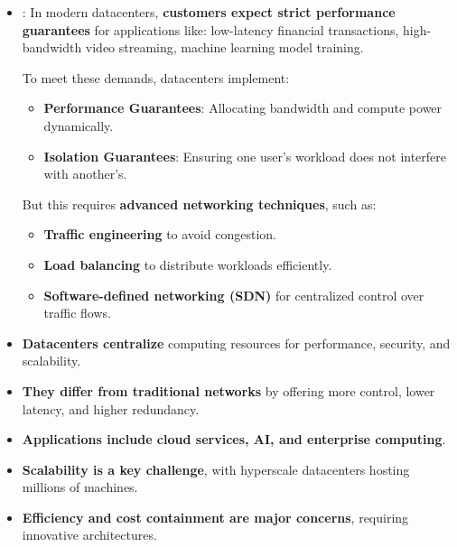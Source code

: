 \begin{itemize}
    \item {}: In modern datacenters, \textbf{customers expect strict performance guarantees} for applications like: low-latency financial transactions, high-bandwidth video streaming, machine learning model training.

    To meet these demands, datacenters implement:
    \begin{itemize}[label=\textcolor{Green3}{}]
        \item \textcolor{Green3}{\textbf{Performance Guarantees}}: Allocating bandwidth and compute power dynamically.
        \item \textcolor{Green3}{\textbf{Isolation Guarantees}}: Ensuring one user's workload does not interfere with another's.
    \end{itemize}

    But this requires \textbf{advanced networking techniques}, such as:
    \begin{itemize}
        \item \textbf{Traffic engineering} to avoid congestion.
        \item \textbf{Load balancing} to distribute workloads efficiently.
        \item \textbf{Software-defined networking (SDN)} for centralized control over traffic flows.
    \end{itemize}
\end{itemize}

\newpage

\begin{takeawaysbox}
    \begin{itemize}
        \item \textbf{Datacenters centralize} computing resources for performance, security, and scalability.
        \item \textbf{They differ from traditional networks} by offering more control, lower latency, and higher redundancy.
        \item \textbf{Applications include cloud services, AI, and enterprise computing}.
        \item \textbf{Scalability is a key challenge}, with hyperscale datacenters hosting millions of machines.
        \item \textbf{Efficiency and cost containment are major concerns}, requiring innovative architectures.
    \end{itemize}
\end{takeawaysbox}
